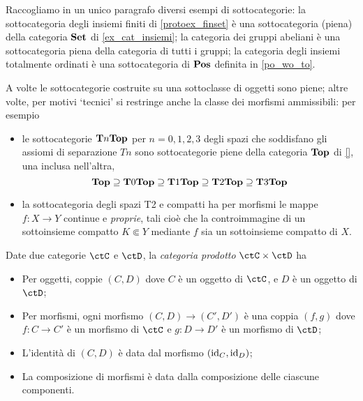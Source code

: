\begin{example}
	Raccogliamo in un unico paragrafo diversi esempi di sottocategorie: la sottocategoria degli insiemi finiti di \ref{protoex_finset} è una sottocategoria (piena) della categoria \(\mathbf{Set}\) di \ref{ex_cat_insiemi}; la categoria dei gruppi abeliani è una sottocategoria piena della categoria di tutti i gruppi; la categoria degli insiemi totalmente ordinati è una sottocategoria di \(\mathbf{Pos}\) definita in \ref{po_wo_to}.

  A volte le sottocategorie costruite su una sottoclasse di oggetti sono piene; altre volte, per motivi `tecnici' si restringe anche la classe dei morfismi ammissibili: per esempio 
  \begin{itemize}
    \item le sottocategorie $\mathbf{T}n\mathbf{Top}$ per $n=0,1,2,3$ degli spazi che soddisfano gli assiomi di separazione $Tn$ sono sottocategorie piene della categoria $\mathbf{Top}$ di \ref{}, una inclusa nell'altra,
      \[\mathbf{Top}\supseteq\mathbf{T}0\mathbf{Top}\supseteq\mathbf{T}1\mathbf{Top}\supseteq\mathbf{T}2\mathbf{Top}\supseteq\mathbf{T}3\mathbf{Top}\]
    \item la sottocategoria degli spazi T2 e compatti ha per morfismi le mappe $f : X\to Y$ continue e \emph{proprie}, tali cioè che la controimmagine di un sottoinsieme compatto $K\Subset Y$ mediante $f$ sia un sottoinsieme compatto di $X$.
  \end{itemize}
\end{example}
\begin{definition}\label{def_cat_prodotto}
	Date due categorie \(\ctC\) e \(\ctD\), la \emph{categoria prodotto} \(\ctC\times\ctD\) ha
	\begin{itemize}
		\item Per oggetti, coppie \((C,D)\) dove \(C\) è un oggetto di \(\ctC\), e \(D\) è un oggetto di \(\ctD\);
		\item Per morfismi, ogni morfismo \((C,D)\to(C',D')\) è una coppia \((f,g)\) dove \(f:C\to C'\) è un morfismo di \(\ctC\) e \(g:D\to D'\) è un morfismo di \(\ctD\);
		\item L'identità di \((C,D)\) è data dal morfismo \((\mathrm{id}_C,\mathrm{id}_D)\);
		\item La composizione di morfismi è data dalla composizione delle ciascune componenti.
	\end{itemize}
\end{definition}
